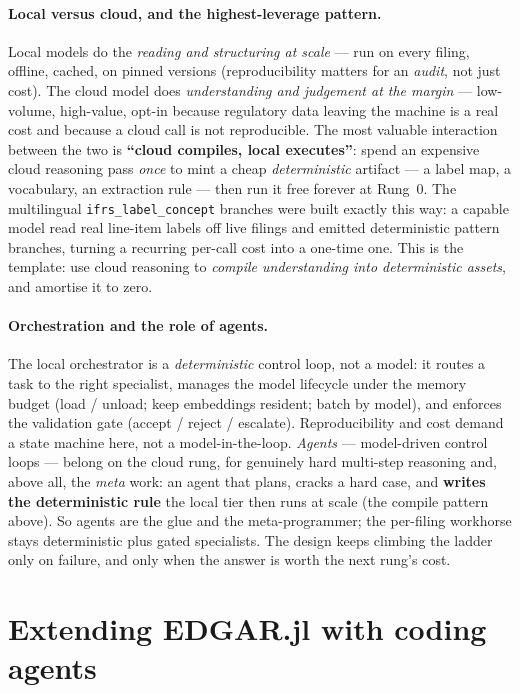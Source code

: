 \documentclass[11pt,a4paper]{report}
\begin{document}
\paragraph{Local versus cloud, and the highest-leverage pattern.} Local models do the \emph{reading and
structuring at scale} --- run on every filing, offline, cached, on pinned versions (reproducibility matters
for an \emph{audit}, not just cost). The cloud model does \emph{understanding and judgement at the margin} ---
low-volume, high-value, opt-in because regulatory data leaving the machine is a real cost and because a cloud
call is not reproducible. The most valuable interaction between the two is \textbf{``cloud compiles, local
executes''}: spend an expensive cloud reasoning pass \emph{once} to mint a cheap \emph{deterministic} artifact
--- a label map, a vocabulary, an extraction rule --- then run it free forever at Rung~0. The multilingual
\texttt{ifrs\_label\_concept} branches were built exactly this way: a capable model read real line-item labels
off live filings and emitted deterministic pattern branches, turning a recurring per-call cost into a one-time
one. This is the template: use cloud reasoning to \emph{compile understanding into deterministic assets}, and
amortise it to zero.

\paragraph{Orchestration and the role of agents.} The local orchestrator is a \emph{deterministic} control
loop, not a model: it routes a task to the right specialist, manages the model lifecycle under the memory
budget (load / unload; keep embeddings resident; batch by model), and enforces the validation gate
(accept / reject / escalate). Reproducibility and cost demand a state machine here, not a model-in-the-loop.
\emph{Agents} --- model-driven control loops --- belong on the cloud rung, for genuinely hard multi-step
reasoning and, above all, the \emph{meta} work: an agent that plans, cracks a hard case, and \textbf{writes
the deterministic rule} the local tier then runs at scale (the compile pattern above). So agents are the glue
and the meta-programmer; the per-filing workhorse stays deterministic plus gated specialists. The design keeps
climbing the ladder only on failure, and only when the answer is worth the next rung's cost.


\section{Extending EDGAR.jl with coding agents}
\label{sec:coding-agents}
\end{document}
